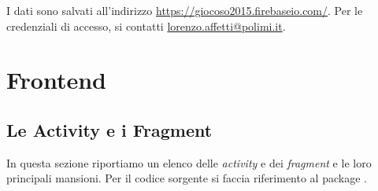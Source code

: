 I dati sono salvati all'indirizzo \url{https://giocoso2015.firebaseio.com/}. Per le credenziali di accesso, si contatti \url{lorenzo.affetti@polimi.it}.

\section{Frontend}

\subsection{Le Activity e i Fragment}
\label{subsec:activities}
In questa sezione riportiamo un elenco delle \textit{activity} e dei \textit{fragment} e le loro principali mansioni.
Per il codice sorgente si faccia riferimento al package .

